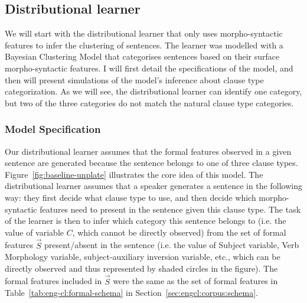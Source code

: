\subsection{Distributional learner}
\label{sec:engcl:model:baseline}

We will start with the distributional learner that only uses morpho-syntactic features to infer the clustering of sentences. The learner was modelled with a Bayesian Clustering Model that categorises sentences based on their surface morpho-syntactic features. I will first detail the specifications of the model, and then will present simulations of the model's inference about clause type categorization. As we will see, the distributional learner can identify one category, but two of the three categories do not match the natural clause type categories.  %


\subsubsection{Model Specification}
\label{sec:engcl:model:baseline:spec}


Our distributional learner assumes that the formal features observed in a given sentence are generated because the sentence belongs to one of three clause types. Figure~\ref{fig:baseline-unplate} illustrates the core idea of this model. The distributional learner assumes that a speaker generates a sentence in the following way: they first decide what clause type to use, and then decide which morpho-syntactic features need to present in the sentence given this clause type. The task of the learner is then to infer which category this sentence belongs to (i.e. the value of variable $C$, which cannot be directly observed) from the set of formal features $\vec{S}$ present/absent in the sentence (i.e. the value of Subject variable, Verb Morphology variable, subject-auxiliary inversion variable, etc., which can be directly observed and thus represented by shaded circles in the figure). The formal features included in $\vec{S}$ were the same as the set of formal features in Table~\ref{tab:eng-cl:formal-schema} in Section~\ref{sec:engcl:corpus:schema}.



